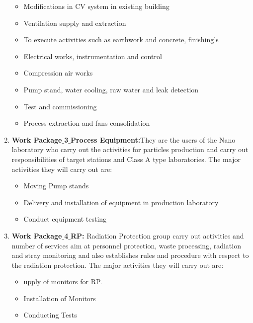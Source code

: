 \begin{enumerate}
\begin{itemize}
		\item Modifications in CV system in existing building 
		
		\item Ventilation supply and extraction
		
		\item To execute activities such as earthwork and concrete, finishing’s
		
		\item Electrical works, instrumentation and control
		
		\item Compression air works 
		
		\item Pump stand, water cooling, raw water and leak detection 
		
		\item Test and commissioning 
		
		\item Process extraction and fans consolidation
	\end{itemize}
	
	\item \textbf{Work Package$\_$3$\_$Process Equipment:}They are the users of the Nano laboratory who carry out the activities for particles production and carry out responsibilities of target stations and Class A type laboratories.
	The major activities they will carry out are:

	\begin{itemize}
		\item Moving Pump stands
		\item Delivery and installation of equipment in production laboratory 
			\item Conduct equipment testing
		
	\end{itemize}

	\item \textbf{Work Package$\_$4$\_$RP:} Radiation Protection group carry out activities and number of services aim at personnel protection, waste processing, radiation and stray monitoring and also establishes rules and procedure with respect to the radiation protection.
	The major activities they will carry out are:
	\begin{itemize}
		\item upply of monitors for RP.
		\item Installation of Monitors
		\item Conducting Tests


\end{itemize}
\end{enumerate}
